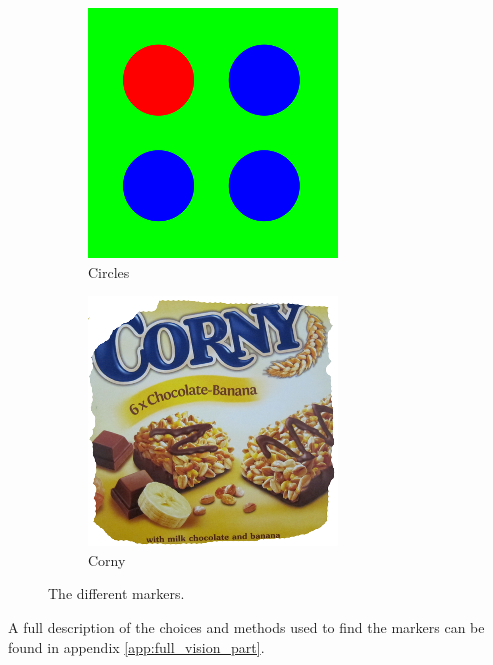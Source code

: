 \begin{figure}[h]
\begin{subfigure}[b]{0.3\linewidth}
 \includegraphics[width=\linewidth]{graphics/Marker1}
 \caption{Circles}
 \label{marker:circle}
 \end{subfigure}
 \begin{subfigure}[b]{0.3\linewidth}
 \centering
 \includegraphics[width=\linewidth]{graphics/Marker3}
 \caption{Corny}
 \label{marker:corny}
 \end{subfigure}
 \caption{The different markers.}
 \label{fig:markers}
\end{figure}

A full description of the choices and methods used to find the markers can be found in appendix \ref{app:full_vision_part}.